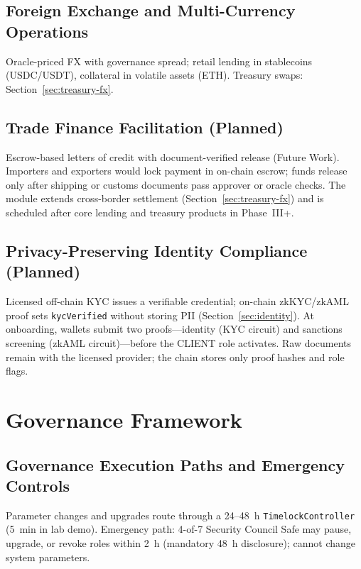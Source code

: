 \documentclass[12pt, a4paper]{report}
\begin{document}
\subsection{Foreign Exchange and Multi-Currency Operations}
Oracle-priced FX with governance spread; retail lending in stablecoins (USDC/USDT), collateral in volatile assets (ETH). Treasury swaps: Section~\ref{sec:treasury-fx}.

\subsection{Trade Finance Facilitation (Planned)}
Escrow-based letters of credit with document-verified release (Future Work). Importers and exporters would lock payment in on-chain escrow; funds release only after shipping or customs documents pass approver or oracle checks. The module extends cross-border settlement (Section~\ref{sec:treasury-fx}) and is scheduled after core lending and treasury products in Phase~III+.

\subsection{Privacy-Preserving Identity Compliance (Planned)}
\label{sec:zkp-compliance}
Licensed off-chain KYC issues a verifiable credential; on-chain zkKYC/zkAML proof sets \texttt{kycVerified} without storing PII (Section~\ref{sec:identity}). At onboarding, wallets submit two proofs---identity (KYC circuit) and sanctions screening (zkAML circuit)---before the CLIENT role activates. Raw documents remain with the licensed provider; the chain stores only proof hashes and role flags.

\section{Governance Framework}
\label{sec:governance-framework}

\subsection{Governance Execution Paths and Emergency Controls}
\label{sec:governance-dual-path}

Parameter changes and upgrades route through a 24--48~h \texttt{TimelockController} (5~min in lab demo). Emergency path: 4-of-7 Security Council Safe may pause, upgrade, or revoke roles within 2~h (mandatory 48~h disclosure); cannot change system parameters.
\end{document}
